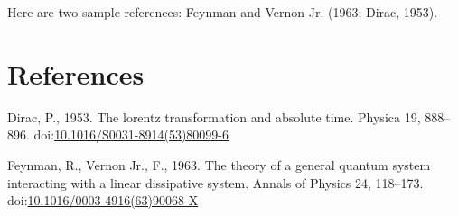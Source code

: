 \documentclass[]{elsarticle} %
\begin{document}
Here are two sample references: Feynman and Vernon Jr. (1963; Dirac,
1953).

\hypertarget{references}{%
\section*{References}\label{references}}

\hypertarget{refs}{}
\leavevmode\hypertarget{ref-Dirac1953888}{}%
Dirac, P., 1953. The lorentz transformation and absolute time. Physica
19, 888--896.
doi:\href{https://doi.org/10.1016/S0031-8914(53)80099-6}{10.1016/S0031-8914(53)80099-6}

\leavevmode\hypertarget{ref-Feynman1963118}{}%
Feynman, R., Vernon Jr., F., 1963. The theory of a general quantum
system interacting with a linear dissipative system. Annals of Physics
24, 118--173.
doi:\href{https://doi.org/10.1016/0003-4916(63)90068-X}{10.1016/0003-4916(63)90068-X}
\end{document}
